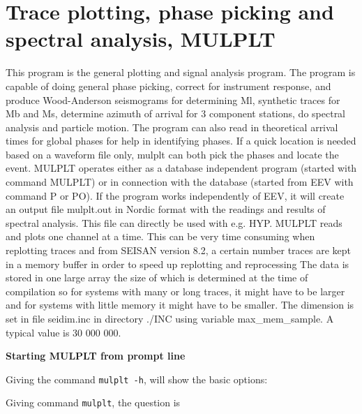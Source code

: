 %
%
\section{Trace plotting, phase picking and spectral analysis, MULPLT}
\label{sect:mulplt}

This program is the general plotting and signal analysis  program. The program is capable of doing general phase picking, correct for instrument response, and produce Wood-Anderson seismograms for determining Ml, synthetic traces for Mb and Ms, determine azimuth of arrival for 3 component stations, do spectral analysis and particle motion. The program can also read in theoretical arrival times for global phases for help in identifying phases. If a quick location is needed based on a waveform file only, mulplt can both pick the phases and locate the event. MULPLT operates either as a database independent program (started with command MULPLT) or in connection with the database (started from EEV with command P or PO). If the program works independently of EEV, it will create an output file mulplt.out in Nordic format with the readings and results of spectral analysis. This file can directly be used with e.g. HYP. MULPLT reads and plots one channel at a time. This can be very time consuming when replotting traces and from SEISAN version 8.2, a certain number traces are kept in a memory buffer in order to speed up replotting and reprocessing The data is stored in one large array the size of which is determined at the time of compilation so for systems with many or long traces, it might have to be larger and for systems with little memory it might have to be smaller. The dimension is set in file seidim.inc in directory ./INC using variable max\_mem\_sample. A typical value is 30 000 000. 

\textbf{Starting MULPLT from prompt line}

Giving the command \texttt{mulplt -h}, will show the basic options:


Giving command \texttt{mulplt}, the question is 

